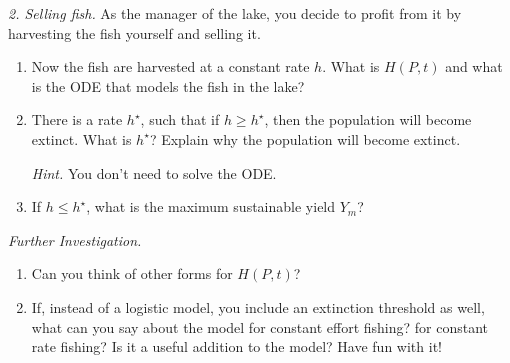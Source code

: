 \vfill

\emph{2. Selling fish.}
As the manager of the lake, you decide to profit from it by harvesting the fish yourself and selling it. 

\begin{enumerate}[label=\emph{(\alph*)}]
\item Now the fish are harvested at a constant rate $h$. What is $H(P,t)$ and what is the ODE that models the fish in the lake?

\item There is a rate $h^{\star}$, such that if $h \geq h^\star$, then the population will become extinct. What is $h^\star$? Explain why the population will become extinct.

\emph{Hint.} You don't need to solve the ODE.



\item If $h \leq h^\star$, what is the maximum sustainable yield $Y_m$?

\end{enumerate}



\vfill

\emph{Further Investigation.}
\begin{enumerate}[label=\emph{\arabic*.}]
\item Can you think of other forms for $H(P,t)$? 

\item If, instead of a logistic model, you include an extinction threshold as well, what can you say about the model for constant effort fishing? for constant rate fishing? Is it a useful addition to the model? Have fun with it!
\end{enumerate}

\begin{noexercises}
\end{noexercises}
